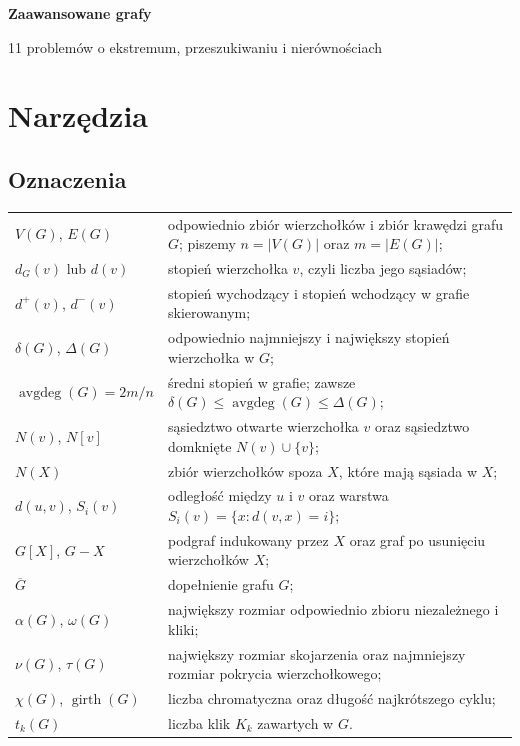 \documentclass{lecture-kuznia}
\def\title{Zaawansowane grafy}
\begin{document}
\begin{center}
  {\Huge\textbf{\title}}

  \medskip
  {\large 11 problemów o ekstremum, przeszukiwaniu i nierównościach}
\end{center}

\fontsize{12}{16}\selectfont

\section{Narzędzia}

\subsection*{Oznaczenia}

\begingroup
\renewcommand{\arraystretch}{1.18}
\begin{tabularx}{\textwidth}{@{}lX@{}}
	$V(G)$, $E(G)$
	& odpowiednio zbiór wierzchołków i zbiór krawędzi grafu $G$;
	piszemy $n=|V(G)|$ oraz $m=|E(G)|$;\\
	$d_G(v)$ lub $d(v)$
	& stopień wierzchołka $v$, czyli liczba jego sąsiadów;\\
	$d^+(v)$, $d^-(v)$
	& stopień wychodzący i stopień wchodzący w grafie skierowanym;\\
	$\delta(G)$, $\Delta(G)$
	& odpowiednio najmniejszy i największy stopień wierzchołka w $G$;\\
	$\operatorname{avgdeg}(G)=2m/n$
	& średni stopień w grafie; zawsze $\delta(G)\leqslant\operatorname{avgdeg}(G)
		\leqslant\Delta(G)$;\\
	$N(v)$, $N[v]$
	& sąsiedztwo otwarte wierzchołka $v$ oraz sąsiedztwo domknięte
	$N(v)\cup\{v\}$;\\
	$N(X)$
	& zbiór wierzchołków spoza $X$, które mają sąsiada w $X$;\\
	$d(u,v)$, $S_i(v)$
	& odległość między $u$ i $v$ oraz warstwa
	$S_i(v)=\{x:d(v,x)=i\}$;\\
	$G[X]$, $G-X$
	& podgraf indukowany przez $X$ oraz graf po usunięciu wierzchołków $X$;\\
	$\overline G$
	& dopełnienie grafu $G$;\\
	$\alpha(G)$, $\omega(G)$
	& największy rozmiar odpowiednio zbioru niezależnego i kliki;\\
	$\nu(G)$, $\tau(G)$
	& największy rozmiar skojarzenia oraz najmniejszy rozmiar pokrycia
	wierzchołkowego;\\
	$\chi(G)$, $\operatorname{girth}(G)$
	& liczba chromatyczna oraz długość najkrótszego cyklu;\\
	$t_k(G)$
	& liczba klik $K_k$ zawartych w $G$.
\end{tabularx}
\endgroup
\end{document}
